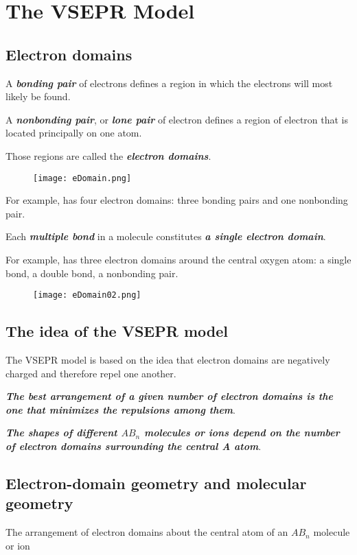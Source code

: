 \documentclass[12pt, a4paper]{report}
\newcommand{\impt}[1]{\textbf{\textit{#1}}}
\newcommand{\hi}{\section}
\newcommand{\hii}{\subsection}
\begin{document}
\hi{The VSEPR Model}
    \hii{Electron domains}
        \par A \impt{bonding pair} of electrons defines a region in which the electrons will
        most likely be found.
        \par A \impt{nonbonding pair}, or \impt{lone pair} of electron defines a region of electron
        that is located principally on one atom.
        \par Those regions are called the \impt{electron domains}.
        \begin{center}
            \begin{figure}[h]
                    \begin{center}
                        \texttt{[image: eDomain.png]}
                    \end{center}
            \end{figure}
        \end{center}
        \par For example,  has four electron domains: three bonding pairs and one nonbonding
        pair.
        \par Each \impt{multiple bond} in a molecule constitutes \impt{a single electron domain}.
        \par For example,  has three electron domains around the central oxygen atom: a
        single bond, a double bond, a nonbonding pair.
        \begin{center}
            \begin{figure}[h]
                    \begin{center}
                        \texttt{[image: eDomain02.png]}
                    \end{center}
            \end{figure}
        \end{center}
    \hii{The idea of the VSEPR model}
        \par The VSEPR model is based on the idea that electron domains are negatively charged and
        therefore repel one another.
        \par \impt{The best arrangement of a given number of electron domains is the one that
        minimizes the repulsions among them}.
        \par \impt{The shapes of different $AB_{n}$ molecules or ions depend on the number of electron
        domains surrounding the central A atom}.
    \hii{Electron-domain geometry and molecular geometry}
        \par The arrangement of electron domains about the central atom of an $AB_{n}$ molecule or ion
\end{document}
